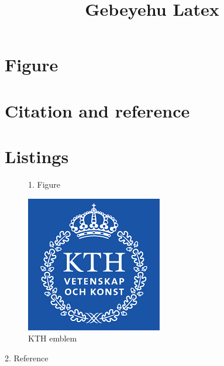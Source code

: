 \documentclass{article}
\title{Gebeyehu Latex}
\begin{document}
\maketitle
\begin{table}
    {\small
    \section{Figure}
    \section{Citation and reference}
    \section{Listings }}
\end{table}

\begin{figure}
    {\Huge 1. Figure}
    
    \vspace{10mm}
    \centering
    \includegraphics[width=\linewidth]{kth.jpg}
    \caption{KTH emblem}
    \label{fig:kth}
\end{figure}
\vspace{150mm}

{\Huge 2. Reference}
\end{document}
